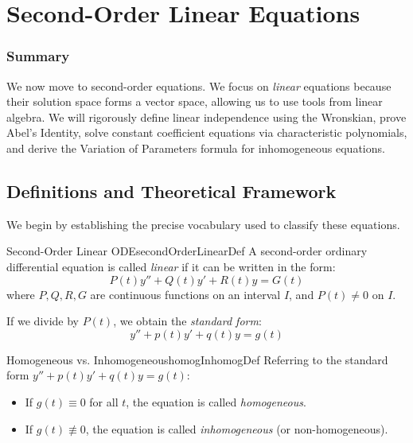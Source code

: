 \documentclass{book}
\begin{document}
\chapter{Second-Order Linear Equations}\label{cha:secondOrderODE}

\subsection*{Summary}
We now move to second-order equations. We focus on \emph{linear} equations because their solution space forms a vector space, allowing us to use tools from linear algebra. We will rigorously define linear independence using the Wronskian, prove Abel's Identity, solve constant coefficient equations via characteristic polynomials, and derive the Variation of Parameters formula for inhomogeneous equations.

\section{Definitions and Theoretical Framework}

We begin by establishing the precise vocabulary used to classify these equations.

\begin{defn}{Second-Order Linear ODE}{secondOrderLinearDef}
    A second-order ordinary differential equation is called \emph{linear} if it can be written in the form:
    \begin{equation}\label{eq:generalLinear2nd}
        P(t)y'' + Q(t)y' + R(t)y = G(t)
    \end{equation}
    where $P, Q, R, G$ are continuous functions on an interval $I$, and $P(t) \ne 0$ on $I$.

    If we divide by $P(t)$, we obtain the \emph{standard form}:
    \[
        y'' + p(t)y' + q(t)y = g(t)
    \]
\end{defn}

\begin{defn}{Homogeneous vs. Inhomogeneous}{homogInhomogDef}
    Referring to the standard form $y'' + p(t)y' + q(t)y = g(t)$:
    \begin{itemize}
        \item If $g(t) \equiv 0$ for all $t$, the equation is called \emph{homogeneous}.
        \item If $g(t) \not\equiv 0$, the equation is called \emph{inhomogeneous} (or non-homogeneous).
    \end{itemize}
\end{defn}
\end{document}
